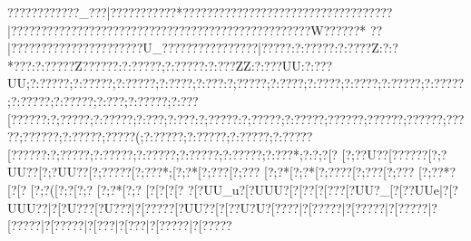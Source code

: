 {{{{{{{{{{{{{{{{{{{{{{{{{{{{{{{{{{{{{{{{{{{{{{{{{{{{{{{{{{{{{{{{{{{{{{{{{{{{{{{{{{{{{{{{{{{{{{{{{{{{{{{{{{{{{{{{{{{{{{{{{{{{{{{{{{{{{{{{{{{{{{{{{{{{{{{{{{{{{{{{{{{{{{{{{{{{{{{{{{{{{{{{{{{{{{{{{{{{{{{{{{{{{{{{{{{{{{{{{{{{{{{{{{{{{{{{{{{{{{{{{{{{{{{{{{{{{{{{{{{{{{{{{{{{{{{{{{{{{{{{{{{{{{{{{{{{{{{{{{{{{{{{{{{{{{{{{{{{{{{{{{{{{{{{{{{{{{{{{{{{{{{{{{{{{{{{{{{{{{{{{{{{{{{{{{{{{{{{{{{{{{{{{{{{{{{{{{{{{{{{{{{{{{{{{{{{{{{{{{{{{{{{{{{{{{{{{{{{{{{{{{{{{{{{{{{{{{{{{{{{{{{{{{{{{{{{{{{{{{{{{{{{{{{{{{{{{{{{{{{{{{{{{{{{{{{{{{{{{{{{{{{{{{{{{{{{{{{{{{{{{{{{{{{{{{{{{{{{{{{{{{{{{{{{{{{{{{{{{{{{{{{{{{{{{{{{{{{{{{{{{{{{{{{{{{{{{{{{{{{{{{{{{{{{{{{{{{{{{{{{{{{{{{{{{{{{{{{{{{{{{{{{{{{{{{{{{{{{{{{{{{{{{{{{{{{{{{{{{{{{{{{{{{{{{{{{{{{{{{{{{{{{{{{{{{{{{{{{{{{{{{{{{{{{{{{{{{{{{{{{{{{{{{{{{{{{{{{{{{{{{{{{{{{{{{{{{{{{{{{{{{{{{{{{{{{{{{{{{{{{{{{{{{{{{{{{{{{{{{{{{{{{{{{{{{{{{{{{{{{{{{{{{{{{{{{{{{{{{{{{{{{{{{{{{{{{{{{{{{{{{{{{{{{{{{{{{{{{{{{{{{{{{{{{{{{{{{{{{{{{{{{{{{{{{{{{{{{{{{{{{{{{{{{{{{{{{{{{{{{{{{{{{{{{{{{{{{{{{{{{{{{{{{{{{{{{{{{{{{{{{{{{{{{{{{{{{{{{{{{{{{{{{{{{{{{{{{{{{{{{{{{{{{{{{{{{{{{{{{{{{{{{{{{{{{{{{{{{{{{{{{{{{{{{{{{{{{{{{{{{{{{{{{{{{{{{{{{{{{{{{{{{{{{{{{{{{{{{{{{{{{{{{{{{{{{{{{{{{{{{{{{{{{{{{{{{{{{{{{{{{{{{{{{{{{{{{{{{{{{{{{{{{{{{{{{{{{{{{{{{{{{{{{{{{{{{{{{{{{{{{{{{{{{{{{{{{{{{{{{{{{{{{{{{{{{{{{{{{{{{{{{{{{{{{{{{{{{{{{{{{{{{{{{{{{{{{{{{{{{{{{{{{{{{{{{{{{{{{{{{{{{{{{{{{{{{{{{{{{{{{{{{{{{{{{{{{{{{{{{{{{{{{{{{{{{{{{{{{{{{{{{{{{{{{{{{{{{{{{{{{{{{{{{{{{{{{{{{{{{{{{{{{{{{{{{{{{{{{{{{{{{{{{{{{{{{{{{{{{{{{{{{{{{{{{{{{{{{{{{{{{{{{{{{{{{{{{{{{{{{{{{{{{{{{{{{{{{{{{{{{{{ ????????????_???|???????????*???????????????????????????????????|?????????????????????????????? ????????????????????W??????*
  ??|???????{???  ????????????U_????{???????{??? ??|?????:?:?????:?:????Z:?:?*???:?:?????Z??????:?:?????;?:?????:?:???ZZ:?:???UU:?:???UU;?:?????;?:?????;?:?????;?:????;?:???:?;?????;?:????;?:????;?:????;?:?????;?:?????;?:?????;?:?????;?:???;?:?????;?:???[??????:?;?????;?:?????;?:???;?:???:?;?????:?;?????;?:?????;??????;??????;??????;????? ;??????;?:?????;?????(;?:?????;?:?????;?:?????;?:?????[??????:?;?????;?:?????;?:?????;?:?????;?:?????;?:???* ;?:?  ;?[?    [?;??U??[??????[?;?UU??[?;?UU??[?;?????[?;???*;[?;?* [?;??? [?;???  [?;?* [?;?*   [?;??? ?[?;??? [?;???
 [?;??*? [?[?   [?;?(   [?;?   [?;?    [?;?*   [?;?
   [?[?    [?[?    {?[?UU_u{?[?UUU?[?[?  ? [?[?  ? {?[?UU?_[?[??UUe|?[?UUU?\?[?????|?[?UU]?|?[?U???\?[?U???|?[????{?[?UU??[?[??U?U{?[????|?[?????|?[?????|?[?????|?[?????|?[?????|?[???|?[???|?[?????|?[?????\?{?????{?|?????[?|?????|?[?????{?|???je[?|?????|?[????*??[?????|?[?????{?|?????[?|?????[?|?????[?|?????{?|?????[?|?????{?|?
???{?|?????{?|?????{?{?  (*??|?????|?{?????|?{?????{?????{?|???????|?????|?{?????|??]UU|?|?   ?|?{???? |?{????(|?{????(|?{???
 ??|?????|?{????|?{????"|?{???*|?{?????{?|????U??|????U{?|????U??{????*|?{???
 ??|???????{???????|???UU??|???UU??????UU??????UU{?????UU|???????{?????UU|?????UU|?????UU??|????*??|????(??|??????|??????????_?|??????U??????????????????????????????????????????????????U???????U?????????????? ??????? ??????? ????????????????????  ?????? ??????????????? ???????????????**??????  ?????????????????????
 ????????????????????????????????????|???????|? }}}}}}}}}}}}}}}}}}}}}}}}}}}}}}}}}}}}}}}}}}}}}}}}}}}}}}}}}}}}}}}}}}}}}}}}}}}}}}}}}}}}}}}}}}}}}}}}}}}}}}}}}}}}}}}}}}}}}}}}}}}}}}}}}}}}}}}}}}}}}}}}}}}}}}}}}}}}}}}}}}}}}}}}}}}}}}}}}}}}}}}}}}}}}}}}}}}}}}}}}}}}}}}}}}}}}}}}}}}}}}}}}}}}}}}}}}}}}}}}}}}}}}}}}}}}}}}}}}}}}}}}}}}}}}}}}}}}}}}}}}}}}}}}}}}}}}}}}}}}}}}}}}}}}}}}}}}}}}}}}}}}}}}}}}}}}}}}}}}}}}}}}}}}}}}}}}}}}}}}}}}}}}}}}}}}}}}}}}}}}}}}}}}}}}}}}}}}}}}}}}}}}}}}}}}}}}}}}}}}}}}}}}}}}}}}}}}}}}}}}}}}}}}}}}}}}}}}}}}}}}}}}}}}}}}}}}}}}}}}}}}}}}}}}}}}}}}}}}}}}}}}}}}}}}}}}}}}}}}}}}}}}}}}}}}}}}}}}}}}}}}}}}}}}}}}}}}}}}}}}}}}}}}}}}}}}}}}}}}}}}}}}}}}}}}}}}}}}}}}}}}}}}}}}}}}}}}}}}}}}}}}}}}}}}}}}}}}}}}}}}}}}}}}}}}}}}}}}}}}}}}}}}}}}}}}}}}}}}}}}}}}}}}}}}}}}}}}}}}}}}}}}}}}}}}}}}}}}}}}}}}}}}}}}}}}}}}}}}}}}}}}}}}}}}}}}}}}}}}}}}}}}}}}}}}}}}}}}}}}}}}}}}}}}}}}}}}}}}}}}}}}}}}}}}}}}}}}}}}}}}}}}}}}}}}}}}}}}}}}}}}}}}}}}}}}}}}}}}}}}}}}}}}}}}}}}}}}}}}}}}}}}}}}}}}}}}}}}}}}}}}}}}}}}}}}}}}}}}}}}}}}}}}}}}}}}}}}}}}}}}}}}}}}}}}}}}}}}}}}}}}}}}}}}}}}}}}}}}}}}}}}}}}}}}}}}}}}}}}}}}}}}}}}}}}}}}}}}}}}}}}}}}}}}}}}}}}}}}}}}}}}}}}}}}}}}}}}}}}}}}}}}}}}}}}}}}}}}}}}}}}}}}}}}}}}}}}}}}}}}}}}}}}}}}}}}}}}}}}}}}}}}}}}}}}}}}}}}}}}}}}}}}}}}}}}}}}}}}}}}}}}}}}}}}}}}}}}}}}}}}}}}}}}}}}}}}}}}}}}}}}}}}}}}}}}}}}}}}}}}}}}}}}}}}}}}}}}}}}}}}}}}}}}}}}}}}}}}}}}}}}}}}}}}}}}}}}}}}}}}}}}}}}}}}}}}}}}}}}}}}}}}}}}}}}}}}}}}}}}}}}}}}}}}}}}}}}}}}}}}}}}}}}}}}}}}}}}}}}}}}}}}}}}}}}}}}}}}}}}}}}}}}}}}}}}}}}}}}}}}}}}}}}}}}}}}}}}}}}}}}}}}}}}}}}}}}}}}}}}}}}}}}}}}}}}}}}}}}}}}}}}}}}}}}}}}}}}}}}}}}}}}}}}}}}}}}}}}}}}}}}}}}}}}}}}}}}}}}}}}}}}}}}}}}}}}}}}}}}}}}}}}}}}}}}}}}}}}}}}}}}}}}}}}}}}}}}}}}}}}}}}}}}}}}}}}}}}}}}}}
